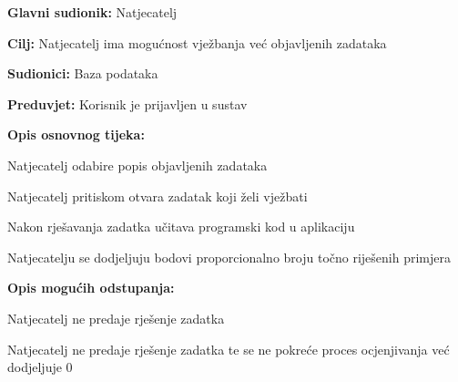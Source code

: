 					\noindent {}
					\begin{packed_item}
						
						\item \textbf{Glavni sudionik: }Natjecatelj
						\item  \textbf{Cilj:} Natjecatelj ima mogućnost vježbanja već objavljenih zadataka 
						\item  \textbf{Sudionici:} Baza podataka
						\item  \textbf{Preduvjet:} Korisnik je prijavljen u sustav
						\item  \textbf{Opis osnovnog tijeka:}
						
						\item[] \begin{packed_enum}
							
							\item Natjecatelj odabire popis objavljenih zadataka
							\item Natjecatelj pritiskom otvara zadatak koji želi vježbati
							\item Nakon rješavanja zadatka učitava programski kod u aplikaciju
							\item Natjecatelju se dodjeljuju bodovi proporcionalno broju točno riješenih primjera 
							
						\end{packed_enum}
						
						\item  \textbf{Opis mogućih odstupanja:}
						
						\item[] \begin{packed_item}
							
							\item[2.a] Natjecatelj ne predaje rješenje zadatka
							\item[] \begin{packed_enum}
								
								\item Natjecatelj ne predaje rješenje zadatka te se ne pokreće proces ocjenjivanja već dodjeljuje 0 
								
							\end{packed_enum}
						\end{packed_item}
					\end{packed_item}
					
